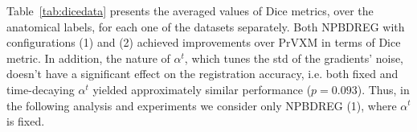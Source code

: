 \documentclass[preprint,authoryear]{elsarticle}
\begin{document}
Table~\ref{tab:dicedata} presents the averaged values of Dice metrics, over the anatomical labels, for each one of the datasets separately. Both NPBDREG with configurations (1) and (2) achieved improvements over PrVXM in terms of Dice metric. In addition, the nature of $\alpha^t$, which tunes the std of the gradients' noise, doesn't have a significant effect on the registration accuracy, i.e. both fixed and time-decaying $\alpha^t$ yielded approximately similar performance ($p=0.093$). Thus, in the following analysis and experiments we consider only NPBDREG (1), where $\alpha^t$ is fixed. 
 \begin{table}[t!]
\centering
{}
\caption{Registration accuracy evaluation results. The mean and std of Dice metric, calculated over labels and test examples for each database (columns), are presented for the three different models (from top to bottom: NPBDREG with configurations (1) and (2) and the baseline PrVXM, respectively.}\label{tab:dicedata}
\end{table}
\end{document}
